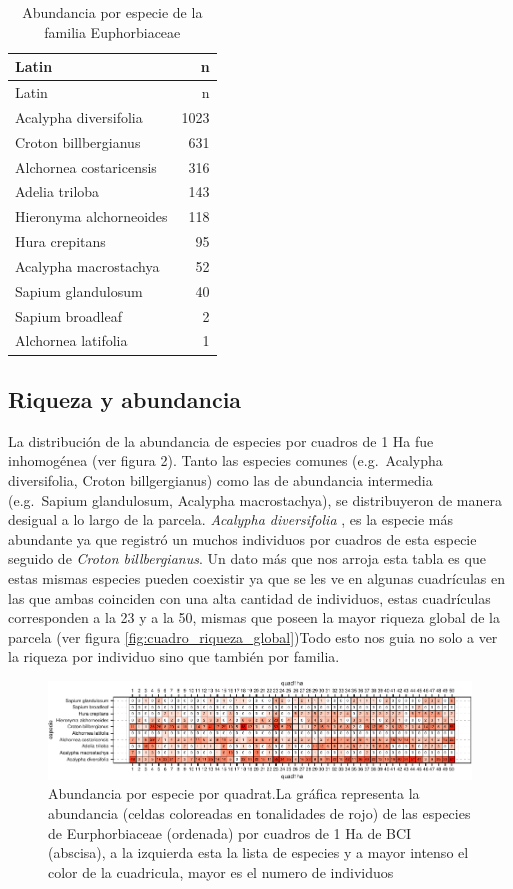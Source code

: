 \documentclass[11pt,]{article}
\begin{document}
\begin{longtable}[]{@{}lr@{}}
\caption{\label{tab:tabla_de_abundancia}Abundancia por especie de la
familia Euphorbiaceae}\tabularnewline
\toprule
Latin & n\tabularnewline
\midrule
\endfirsthead
\toprule
Latin & n\tabularnewline
\midrule
\endhead
Acalypha diversifolia & 1023\tabularnewline
Croton billbergianus & 631\tabularnewline
Alchornea costaricensis & 316\tabularnewline
Adelia triloba & 143\tabularnewline
Hieronyma alchorneoides & 118\tabularnewline
Hura crepitans & 95\tabularnewline
Acalypha macrostachya & 52\tabularnewline
Sapium glandulosum & 40\tabularnewline
Sapium broadleaf & 2\tabularnewline
Alchornea latifolia & 1\tabularnewline
\bottomrule
\end{longtable}

\subsection{Riqueza y abundancia}\label{riqueza-y-abundancia}

La distribución de la abundancia de especies por cuadros de 1 Ha fue
inhomogénea (ver figura 2). Tanto las especies comunes (e.g.~Acalypha
diversifolia, Croton billgergianus) como las de abundancia intermedia
(e.g.~Sapium glandulosum, Acalypha macrostachya), se distribuyeron de
manera desigual a lo largo de la parcela. \emph{Acalypha diversifolia} ,
es la especie más abundante ya que registró un muchos individuos por
cuadros de esta especie seguido de \emph{Croton billbergianus}. Un dato
más que nos arroja esta tabla es que estas mismas especies pueden
coexistir ya que se les ve en algunas cuadrículas en las que ambas
coinciden con una alta cantidad de individuos, estas cuadrículas
corresponden a la 23 y a la 50, mismas que poseen la mayor riqueza
global de la parcela (ver figura \ref{fig:cuadro_riqueza_global})Todo
esto nos guia no solo a ver la riqueza por individuo sino que también
por familia.

\begin{figure}
\centering
\includegraphics{manuscrito_files/figure-latex/unnamed-chunk-3-1.pdf}
\caption{\label{fig:abun_sp_q}Abundancia por especie por quadrat.La
gráfica representa la abundancia (celdas coloreadas en tonalidades de
rojo) de las especies de Eurphorbiaceae (ordenada) por cuadros de 1 Ha
de BCI (abscisa), a la izquierda esta la lista de especies y a mayor
intenso el color de la cuadricula, mayor es el numero de individuos}
\end{figure}
\end{document}
